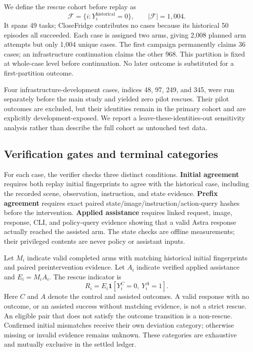 \documentclass[10pt,twocolumn,letterpaper]{article}
\newcommand{\N}{1{,}004}
\newcommand{\F}{\mathcal F}
\newcommand{\ind}{\mathbf 1}
\begin{document}
We define the rescue cohort before replay as
\begin{equation}
\F=\{i:Y_i^{\mathrm{historical}}=0\},\qquad |\F|=\N.
\end{equation}
It spans 49 tasks; CloseFridge contributes no cases because its historical 50 episodes all succeeded. Each case is assigned two arms, giving 2,008 planned arm attempts but only 1,004 unique cases. The first campaign permanently claims 36 cases; an infrastructure continuation claims the other 968. This partition is fixed at whole-case level before continuation. No later outcome is substituted for a first-partition outcome.

Four infrastructure-development cases, indices 48, 97, 249, and 345, were run separately before the main study and yielded zero pilot rescues. Their pilot outcomes are excluded, but their identities remain in the primary cohort and are explicitly development-exposed. We report a leave-these-identities-out sensitivity analysis rather than describe the full cohort as untouched test data.

\subsection{Verification gates and terminal categories}
\label{sec:gates}
For each case, the verifier checks three distinct conditions. \textbf{Initial agreement} requires both replay initial fingerprints to agree with the historical case, including the recorded scene, observation, instruction, and state evidence. \textbf{Prefix agreement} requires exact paired state/image/instruction/action-query hashes before the intervention. \textbf{Applied assistance} requires linked request, image, response, CLI, and policy-query evidence showing that a valid Astra response actually reached the assisted arm. The state checks are offline measurements; their privileged contents are never policy or assistant inputs.

Let $M_i$ indicate valid completed arms with matching historical initial fingerprints and paired preintervention evidence. Let $A_i$ indicate verified applied assistance and $E_i=M_iA_i$. The rescue indicator is
\begin{equation}
R_i=E_i\ind[Y_i^{C}=0,\ Y_i^{A}=1].
\label{eq:rescue}
\end{equation}
Here $C$ and $A$ denote the control and assisted outcomes. A valid response with no outcome, or an assisted success without matching evidence, is not a strict rescue. An eligible pair that does not satisfy the outcome transition is a non-rescue. Confirmed initial mismatches receive their own deviation category; otherwise missing or invalid evidence remains unknown. These categories are exhaustive and mutually exclusive in the settled ledger.
\end{document}
